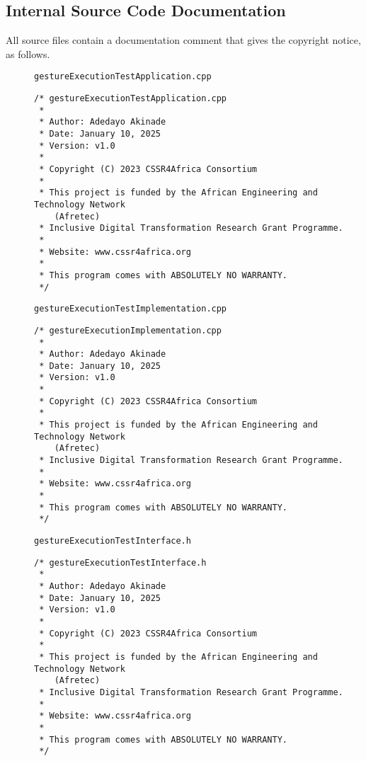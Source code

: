 \documentclass{CSSRforAfrica}
\newcommand{\checkboxChecked}{\fbox{\ding{51}}} %
\begin{document}
 
 
\subsection{Internal Source Code Documentation}
\label{subsection:gesture_execution_test_documentation_standards}  

\noindent All source files contain a documentation comment that gives the copyright notice, as follows.
 
\begin{description}

\item[\checkboxChecked] {\small \verb+gestureExecutionTestApplication.cpp+}  
{\small \begin{verbatim}
/* gestureExecutionTestApplication.cpp
 *
 * Author: Adedayo Akinade
 * Date: January 10, 2025
 * Version: v1.0
 * 
 * Copyright (C) 2023 CSSR4Africa Consortium
 * 
 * This project is funded by the African Engineering and Technology Network 
    (Afretec) 
 * Inclusive Digital Transformation Research Grant Programme. 
 *
 * Website: www.cssr4africa.org
 *
 * This program comes with ABSOLUTELY NO WARRANTY.
 */
\end{verbatim} }

\newpage
\item[\checkboxChecked]  {\small \verb+gestureExecutionTestImplementation.cpp+}  
{\small \begin{verbatim}
/* gestureExecutionImplementation.cpp
 *
 * Author: Adedayo Akinade
 * Date: January 10, 2025
 * Version: v1.0
 * 
 * Copyright (C) 2023 CSSR4Africa Consortium
 * 
 * This project is funded by the African Engineering and Technology Network
    (Afretec) 
 * Inclusive Digital Transformation Research Grant Programme. 
 *
 * Website: www.cssr4africa.org
 *
 * This program comes with ABSOLUTELY NO WARRANTY.
 */
\end{verbatim} }

\item[\checkboxChecked] {\small \verb+gestureExecutionTestInterface.h+}   
{\small \begin{verbatim}
/* gestureExecutionTestInterface.h
 *
 * Author: Adedayo Akinade
 * Date: January 10, 2025
 * Version: v1.0
 * 
 * Copyright (C) 2023 CSSR4Africa Consortium
 * 
 * This project is funded by the African Engineering and Technology Network
    (Afretec) 
 * Inclusive Digital Transformation Research Grant Programme. 
 *
 * Website: www.cssr4africa.org
 *
 * This program comes with ABSOLUTELY NO WARRANTY.
 */
\end{verbatim} }


\end{description}
\end{document}
